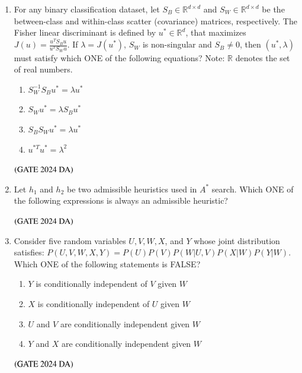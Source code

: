 \documentclass[journal,12pt,onecolumn]{IEEEtran}
\theoremstyle{remark}
\begin{document}
\begin{enumerate}[resume]
\item For any binary classification dataset, let $S_B \in \mathbb{R}^{d \times d}$ and $S_W \in \mathbb{R}^{d \times d}$ be the between-class and within-class scatter (covariance) matrices, respectively. The Fisher linear discriminant is defined by $u^* \in \mathbb{R}^d$, that maximizes $J(u) = \frac{u^T S_B u}{u^T S_W u}$. If $\lambda = J(u^*)$, $S_W$ is non-singular and $S_B \neq 0$, then $(u^*, \lambda)$ must satisfy which ONE of the following equations?
Note: $\mathbb{R}$ denotes the set of real numbers.
\begin{multicols}{4}
\begin{enumerate}
\item $S_W^{-1} S_B u^* = \lambda u^*$
\item $S_W u^* = \lambda S_B u^*$
\item $S_B S_W u^* = \lambda u^*$
\item $u^{*T} u^* = \lambda^2$
\end{enumerate}
\end{multicols}
\hfill $\left(\text{GATE 2024 DA}\right)$


\item Let $h_1$ and $h_2$ be two admissible heuristics used in $A^*$ search. Which ONE of the following expressions is always an admissible heuristic?
\begin{enumerate}
\end{enumerate}
\hfill $\left(\text{GATE 2024 DA}\right)$


\item Consider five random variables $U, V, W, X$, and $Y$ whose joint distribution satisfies:
$P(U, V, W, X, Y) = P(U)P(V)P(W|U, V)P(X|W)P(Y|W)$.
Which ONE of the following statements is FALSE?
\begin{enumerate}
\item $Y$ is conditionally independent of $V$ given $W$
\item $X$ is conditionally independent of $U$ given $W$
\item $U$ and $V$ are conditionally independent given $W$
\item $Y$ and $X$ are conditionally independent given $W$
\end{enumerate}
\hfill $\left(\text{GATE 2024 DA}\right)$



\end{enumerate}
\end{document}
